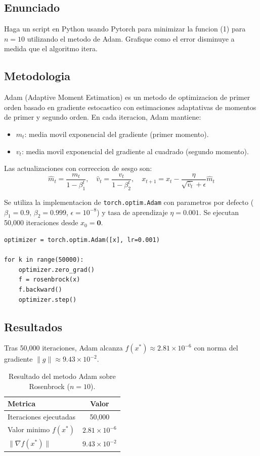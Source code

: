 \documentclass{article}
\begin{document}
\subsection{Enunciado}

Haga un script en Python usando Pytorch para minimizar la funcion (1) para $n = 10$ utilizando el metodo de Adam. Grafique como el error disminuye a medida que el algoritmo itera.

\subsection{Metodologia}

Adam (Adaptive Moment Estimation) es un metodo de optimizacion de primer orden basado en gradiente estocastico con estimaciones adaptativas de momentos de primer y segundo orden. En cada iteracion, Adam mantiene:
\begin{itemize}
    \item $m_t$: media movil exponencial del gradiente (primer momento).
    \item $v_t$: media movil exponencial del gradiente al cuadrado (segundo momento).
\end{itemize}

Las actualizaciones con correccion de sesgo son:
\[
\hat{m}_t = \frac{m_t}{1 - \beta_1^t}, \quad \hat{v}_t = \frac{v_t}{1 - \beta_2^t}, \quad x_{t+1} = x_t - \frac{\eta}{\sqrt{\hat{v}_t} + \epsilon} \hat{m}_t
\]

Se utiliza la implementacion de \texttt{torch.optim.Adam} con parametros por defecto ($\beta_1 = 0.9$, $\beta_2 = 0.999$, $\epsilon = 10^{-8}$) y tasa de aprendizaje $\eta = 0.001$. Se ejecutan 50,000 iteraciones desde $x_0 = \mathbf{0}$.

\begin{lstlisting}
optimizer = torch.optim.Adam([x], lr=0.001)

for k in range(50000):
    optimizer.zero_grad()
    f = rosenbrock(x)
    f.backward()
    optimizer.step()
\end{lstlisting}

\subsection{Resultados}

Tras 50,000 iteraciones, Adam alcanza $f(x^*) \approx 2.81 \times 10^{-6}$ con norma del gradiente $\|g\| \approx 9.43 \times 10^{-2}$.

\begin{table}[H]
\centering
\begin{tabular}{lc}
\hline
\textbf{Metrica} & \textbf{Valor} \\
\hline
Iteraciones ejecutadas & 50,000 \\
Valor minimo $f(x^*)$ & $2.81 \times 10^{-6}$ \\
$\|\nabla f(x^*)\|$ & $9.43 \times 10^{-2}$ \\
\hline
\end{tabular}
\caption{Resultado del metodo Adam sobre Rosenbrock ($n=10$).}
\label{tab:p5_result}
\end{table}
\end{document}
